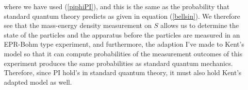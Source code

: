where we have used (\ref{piphiPI}), and this is the same as the probability that standard quantum theory predicts as given in equation (\ref{bellsin}). We therefore see that the mass-energy density measurement on $S$ allows us to determine the state of the particles and the apparatus before the particles are measured in an EPR-Bohm type experiment, and furthermore, the adaption I've made to Kent's model so that it can compute probabilities of the measurement outcomes of this experiment produces the same probabilities as standard quantum mechanics. Therefore, since PI hold's in standard quantum theory, it must also hold Kent's adapted model as well.\label{kentpiend}

